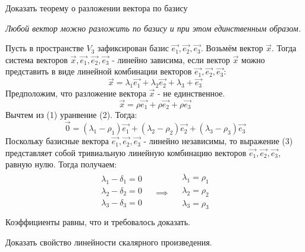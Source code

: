 \begin{question}
  Доказать теорему о разложении вектора по базису
\end{question}
\begin{answer}
  \begin{center}
    \textit{Любой вектор можно разложить по базису и при этом единственным образом.} 
  \end{center}  
  Пусть в пространстве $V_3$ зафиксирован базис $\vec{e_1}, \vec{e_2}, \vec{e_3}$. Возьмём вектор $\vec{x}$. Тогда система векторов $\vec{x}, \vec{e_1}, \vec{e_2}, \vec{e_3}$ - линейно зависима, если вектор $\vec{x}$ можно представить в виде линейной комбинации векторов $\vec{e_1}, \vec{e_2}, \vec{e_3}$: \[
  \vec{x} = \lambda_1 \vec{e_1} + \lambda_2 \vec{e_2} + \lambda_3 + \vec{e_3} \tag{1}
\]
  Предположим, что разложение вектора $\vec{x}$ - не единственное. \[
  \vec{x} = \rho \vec{e_1} + \rho \vec{e_2} + \rho \vec{e_3} \tag{2}
\]
  Вычтем из (1) уранвение (2). Тогда: \[
    \vec{0} = \left( \lambda_1 - \rho_1 \right) \vec{e_1} + \left( \lambda_2 - \rho_2 \right) \vec{e_2} + \left( \lambda_3 - \rho_3 \right) \vec{e_3} \tag{3}
\]
Поскольку базисные вектора $\vec{e_1}, \vec{e_2}, \vec{e_3}$ - линейно независимы, то выражение (3) представляет собой тривиальную линейную комбинацию векторов $\vec{e_1}, \vec{e_2}, \vec{e_3}$, равную нулю. Тогда получаем:
  \begin{gather*}
    \begin{matrix}  
      \lambda_1 - \delta_1 = 0 \\
      \lambda_2 - \delta_2 = 0 \\
      \lambda_3 - \delta_3 = 0 \\
    \end{matrix}
    \quad \implies \quad
    \begin{matrix}
      \lambda_1 = \rho_1 \\
      \lambda_2 = \rho_2 \\
      \lambda_3 = \rho_3 \\
    \end{matrix}
  \end{gather*}
  Коэффициенты равны, что и требовалось доказать.
\end{answer}

\begin{question}
  Доказать свойство линейности скалярного произведения.
\end{question}

